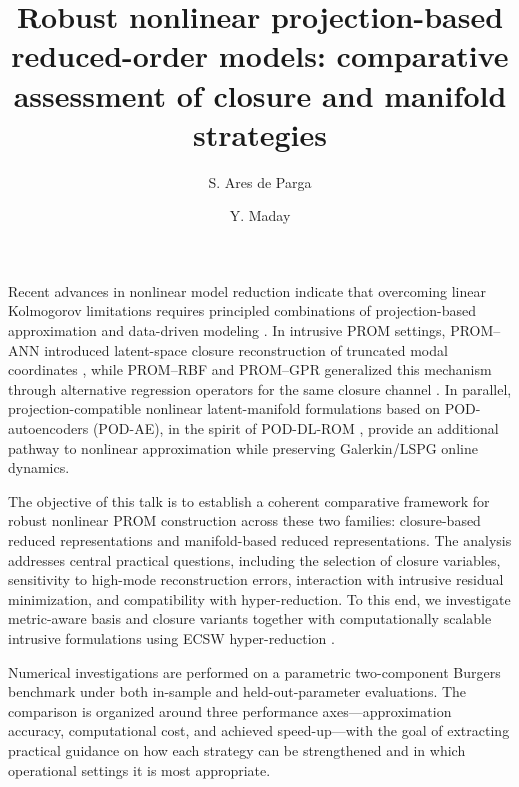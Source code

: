 \documentclass[a4paper,11pt]{article}
\date{}
\begin{document}
\title{Robust nonlinear projection-based reduced-order models: comparative assessment of closure and manifold strategies}

\author[1]{S. Ares de Parga}
\author[2]{Y. Maday}


\maketitle
\thispagestyle{empty}
\vspace{-0.6cm}

Recent advances in nonlinear model reduction indicate that overcoming linear Kolmogorov limitations requires principled combinations of projection-based approximation and data-driven modeling \cite{aghili2026nonlinear}. In intrusive PROM settings, PROM--ANN introduced latent-space closure reconstruction of truncated modal coordinates \cite{barnett2023neural}, while PROM--RBF and PROM--GPR generalized this mechanism through alternative regression operators for the same closure channel \cite{aresdeparga2026regression}. In parallel, projection-compatible nonlinear latent-manifold formulations based on POD-autoencoders (POD-AE), in the spirit of POD-DL-ROM \cite{fresca2022pod}, provide an additional pathway to nonlinear approximation while preserving Galerkin/LSPG online dynamics.

The objective of this talk is to establish a coherent comparative framework for robust nonlinear PROM construction across these two families: closure-based reduced representations and manifold-based reduced representations. The analysis addresses central practical questions, including the selection of closure variables, sensitivity to high-mode reconstruction errors, interaction with intrusive residual minimization, and compatibility with hyper-reduction. To this end, we investigate metric-aware basis and closure variants together with computationally scalable intrusive formulations using ECSW hyper-reduction \cite{grimberg2021mesh}.

Numerical investigations are performed on a parametric two-component Burgers benchmark under both in-sample and held-out-parameter evaluations. The comparison is organized around three performance axes---approximation accuracy, computational cost, and achieved speed-up---with the goal of extracting practical guidance on how each strategy can be strengthened and in which operational settings it is most appropriate.
\end{document}
